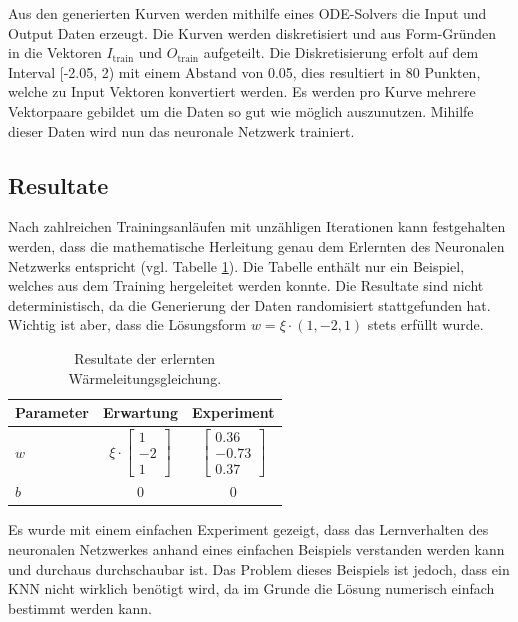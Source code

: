 Aus den generierten Kurven werden mithilfe eines ODE-Solvers die Input und Output Daten erzeugt. Die Kurven werden diskretisiert und aus Form-Gründen in die Vektoren $I_{\text{train}}$ und $O_{\text{train}}$ aufgeteilt. Die Diskretisierung erfolt auf dem Interval [-2.05, 2) mit einem Abstand von 0.05, dies resultiert in 80 Punkten, welche zu Input Vektoren konvertiert werden. Es werden pro Kurve mehrere Vektorpaare gebildet um die Daten so gut wie möglich auszunutzen. Mihilfe dieser Daten wird nun das neuronale Netzwerk trainiert.

\subsection{Resultate}
Nach zahlreichen Trainingsanläufen mit unzähligen Iterationen kann
festgehalten werden, dass die mathematische Herleitung genau dem
Erlernten des Neuronalen Netzwerks entspricht (vgl. Tabelle
\ref{tbl:result_heat}). Die Tabelle enthält nur ein Beispiel, welches
aus dem Training hergeleitet werden konnte. Die Resultate sind nicht
deterministisch, da die Generierung der Daten randomisiert stattgefunden
hat. Wichtig ist aber, dass die Lösungsform $w = \xi \cdot (1, -2,
1)$ stets erfüllt wurde.

\begin{table}
	\centering
	\def\arraystretch{1.1}
	\begin{tabular}{l|c|c}
		Parameter & Erwartung & Experiment \\
		\hline
		$w$ & $\xi \cdot \begin{bmatrix} 1 \\ -2 \\ 1 \end{bmatrix}$ & $\begin{bmatrix} 0.36 \\ -0.73 \\ 0.37 \end{bmatrix}$ \\
		$b$ & 0 & 0 \\
	\end{tabular}
	\caption{Resultate der erlernten Wärmeleitungsgleichung.
	\label{tbl:result_heat} }
\end{table}

Es wurde mit einem einfachen Experiment gezeigt, dass das Lernverhalten des neuronalen Netzwerkes anhand eines einfachen Beispiels verstanden werden kann und durchaus durchschaubar ist. Das Problem dieses Beispiels ist jedoch, dass ein KNN nicht wirklich benötigt wird, da im Grunde die Lösung numerisch einfach bestimmt werden kann.
